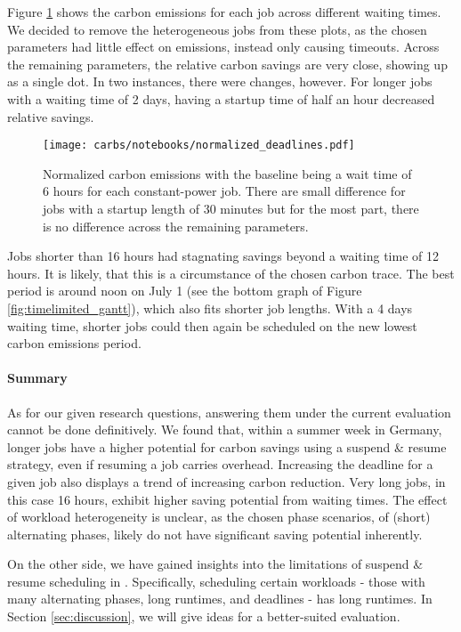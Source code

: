 Figure \ref{fig:different_deadlines_normalized} shows the carbon emissions for each job across different waiting times.
We decided to remove the heterogeneous jobs from these plots, as the chosen parameters had little effect on emissions, instead only causing timeouts. 
Across the remaining parameters, the relative carbon savings are very close, showing up as a single dot.
In two instances, there were changes, however.
For longer jobs with a waiting time of 2 days, having a startup time of half an hour decreased relative savings. 

\begin{figure}[H]
    \texttt{[image: carbs/notebooks/normalized\_deadlines.pdf]}
    \caption[short]{
        Normalized carbon emissions with the baseline being a wait time of 6 hours for each constant-power job. 
        There are small difference for jobs with a startup length of 30 minutes but for the most part, there is no difference across the remaining parameters.
    }

    \label{fig:different_deadlines_normalized}
\end{figure}

Jobs shorter than 16 hours had stagnating savings beyond a waiting time of 12 hours. 
It is likely, that this is a circumstance of the chosen carbon trace.
The best period is around noon on July 1 (see the bottom graph of Figure \ref{fig:timelimited_gantt}), which also fits shorter job lengths. 
With a 4 days waiting time, shorter jobs could then again be scheduled on the new lowest carbon emissions period.

\paragraph{Summary}

As for our given research questions, answering them under the current evaluation cannot be done definitively. We found that, within a summer week in Germany, longer jobs have a higher potential for carbon savings using a suspend \& resume strategy, even if resuming a job carries overhead. Increasing the deadline for a given job also displays a trend of increasing carbon reduction. 
Very long jobs, in this case 16 hours, exhibit higher saving potential from waiting times.
The effect of workload heterogeneity is unclear, as the chosen phase scenarios, of (short) alternating phases, likely do not have significant saving potential inherently.

On the other side, we have gained insights into the limitations of suspend \& resume scheduling in \programname{}. Specifically, scheduling certain workloads - those with many alternating phases, long runtimes, and deadlines - has long runtimes.
In Section \ref{sec:discussion}, we will give ideas for a better-suited evaluation.
